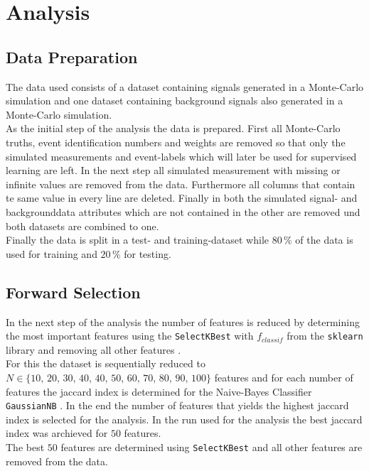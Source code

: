 \section{Analysis}\label{sec:Analysis}

\subsection{Data Preparation}

The data used consists of a dataset containing signals generated in a Monte-Carlo simulation and one dataset containing
background signals also generated in a Monte-Carlo simulation. \\
As the initial step of the analysis the data is prepared.
First all Monte-Carlo truths, event identification numbers and weights are removed so that only the simulated measurements and
event-labels which will later be used for supervised learning are left. In the next step all simulated measurement with missing or
infinite values are removed from the data. Furthermore all columns that contain te same value in every line are deleted.
Finally in both the simulated signal- and backgrounddata attributes which are not contained in the other are removed und
both datasets are combined to one. \\
Finally the data is split in a test- and training-dataset while $80 \, \%$ of the data is used for training and $20 \,\%$
for testing.

\subsection{Forward Selection}

In the next step of the analysis the number of features is reduced by determining the most important features using
the \texttt{SelectKBest} with \texttt{$f_{classif}$} from the \texttt{sklearn} library and removing all other features \cite{scikit-learn}. \\
For this the dataset is sequentially reduced to \\
$N \in \{ 10, \, 20, \, 30, \, 40, \, 40, \, 50, \, 60, \, 70, \, 80, \, 90, \, 100 \}$
features and for each number of features the jaccard index is determined for the Naive-Bayes Classifier \texttt{GaussianNB} \cite{scikit-learn}.
In the end the number of features that yields the highest jaccard index is selected for the analysis.
In the run used for the analysis the best jaccard index was archieved for $50$ features. \\
The best $50$ features are determined using \texttt{SelectKBest} and all other features are removed from the data.


